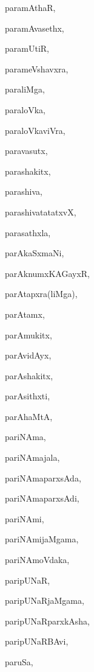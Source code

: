 \begin{multicols}{2}
{paramAthaR}, \pageref{paramAthaR}

{paramAvasethx}, \pageref{paramAvasethx}

{paramUtiR}, \pageref{paramUtiR}

{parameVshavxra}, \pageref{parameVshavxra}

{paraliMga}, \pageref{paraliMga}

{paraloVka}, \pageref{paraloVka}

{paraloVkaviVra}, \pageref{paraloVkaviVra}

{paravasutx}, \pageref{paravasutx}

{parashakitx}, \pageref{parashakitx}

{parashiva}, \pageref{parashiva}

{parashivatatatxvX}, \pageref{parashivatatatxvX}

{parasathxla}, \pageref{parasathxla}

{parAkaSxmaNi}, \pageref{parAkaSxmaNi}

{parAknumxKAGayxR}, \pageref{parAknumxKAGayxR}

{parAtapxra(liMga)}, \pageref{parAtapxraliMga}

{parAtamx}, \pageref{parAtamx}

{parAmukitx}, \pageref{parAmukitx}

{parAvidAyx}, \pageref{parAvidAyx}

{parAshakitx}, \pageref{parAshakitx}

{parAsithxti}, \pageref{parAsithxti}

{parAhaMtA}, \pageref{parAhaMtA}

{pariNAma}, \pageref{pariNAma}

{pariNAmajala}, \pageref{pariNAmajala}

{pariNAmaparxsAda}, \pageref{pariNAmaparxsAda}

{pariNAmaparxsAdi}, \pageref{pariNAmaparxsAdi}

{pariNAmi}, \pageref{pariNAmi}

{pariNAmijaMgama}, \pageref{pariNAmijaMgama}

{pariNAmoVdaka}, \pageref{pariNAmoVdaka}

{paripUNaR}, \pageref{paripUNaR}

{paripUNaRjaMgama}, \pageref{paripUNaRjaMgama}

{paripUNaRparxkAsha}, \pageref{paripUNaRparxkAsha}

{paripUNaRBAvi}, \pageref{paripUNaRBAvi}

{paruSa}, \pageref{paruSa}


\end{multicols}
